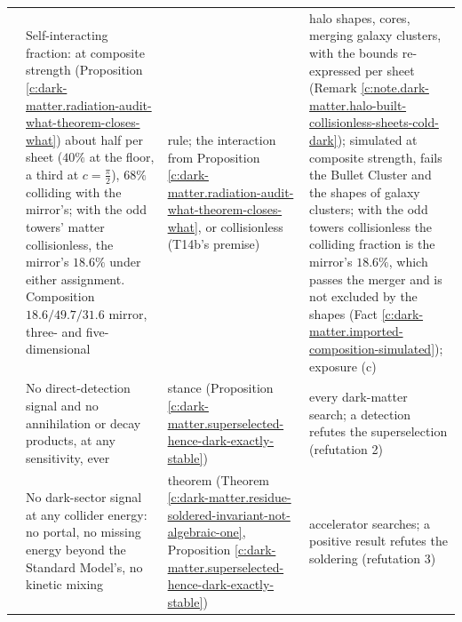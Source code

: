 \documentclass[11pt]{article}
\theoremstyle{definition}
\theoremstyle{plain}
\begin{document}
\begin{center}
\begin{tabular}{>{ \arraybackslash}p{0.5cm}>{ \arraybackslash}p{5.2cm}>{ \arraybackslash}p{2.4cm}>{ \arraybackslash}p{5.6cm}}
6 & Self-interacting fraction: at composite strength (Proposition \ref{c:dark-matter.radiation-audit-what-theorem-closes-what}) about half per sheet ($40\%$ at the floor, a third at $c = \tfrac{\pi}{2}$), $68\%$ colliding with the mirror's; with the odd towers' matter collisionless, the mirror's $18.6\%$ under either assignment. Composition $18.6/49.7/31.6$ mirror, three- and five-dimensional & rule; the interaction from Proposition \ref{c:dark-matter.radiation-audit-what-theorem-closes-what}, or collisionless (T14b's premise) & halo shapes, cores, merging galaxy clusters, with the bounds re-expressed per sheet (Remark \ref{c:note.dark-matter.halo-built-collisionless-sheets-cold-dark}); simulated at composite strength, fails the Bullet Cluster and the shapes of galaxy clusters; with the odd towers collisionless the colliding fraction is the mirror's $18.6\%$, which passes the merger and is not excluded by the shapes (Fact \ref{c:dark-matter.imported-composition-simulated}); exposure (c) \\[2pt]
7 & No direct-detection signal and no annihilation or decay products, at any sensitivity, ever & stance (Proposition \ref{c:dark-matter.superselected-hence-dark-exactly-stable}) & every dark-matter search; a detection refutes the superselection (refutation 2) \\[2pt]
8 & No dark-sector signal at any collider energy: no portal, no missing energy beyond the Standard Model's, no kinetic mixing & theorem (Theorem \ref{c:dark-matter.residue-soldered-invariant-not-algebraic-one}, Proposition \ref{c:dark-matter.superselected-hence-dark-exactly-stable}) & accelerator searches; a positive result refutes the soldering (refutation 3) \\
\bottomrule
\end{tabular}
\end{center}
\end{document}

